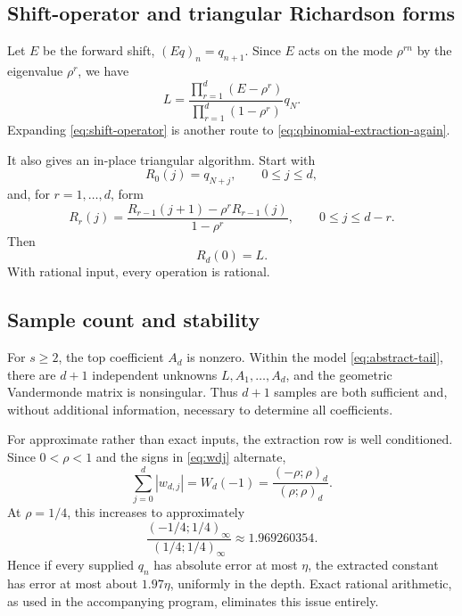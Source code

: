 \documentclass[11pt]{article}
\newcommand{\poch}[3]{\left(#1;#2\right)_{#3}}
\begin{document}
\subsection{Shift-operator and triangular Richardson forms}

Let $E$ be the forward shift, $(Eq)_n=q_{n+1}$.  Since $E$ acts on the mode
$\rho^{rn}$ by the eigenvalue $\rho^r$, we have
\begin{equation}
 \boxed{
 L=\frac{\prod_{r=1}^{d}(E-\rho^r)}
 {\prod_{r=1}^{d}(1-\rho^r)}q_N.}
 \label{eq:shift-operator}
\end{equation}
Expanding \eqref{eq:shift-operator} is another route to
\eqref{eq:qbinomial-extraction-again}.

It also gives an in-place triangular algorithm.  Start with
\begin{equation}
 R_0(j)=q_{N+j},\qquad 0\le j\le d,
\end{equation}
and, for $r=1,\ldots,d$, form
\begin{equation}
 R_r(j)=\frac{R_{r-1}(j+1)-\rho^rR_{r-1}(j)}{1-\rho^r},
 \qquad 0\le j\le d-r.
 \label{eq:richardson-recursion}
\end{equation}
Then
\begin{equation}
 R_d(0)=L.
 \label{eq:richardson-result}
\end{equation}
With rational input, every operation is rational.

\subsection{Sample count and stability}

For $s\ge2$, the top coefficient $A_d$ is nonzero.  Within the model
\eqref{eq:abstract-tail}, there are $d+1$ independent unknowns
$L,A_1,\ldots,A_d$, and the geometric Vandermonde matrix is nonsingular.
Thus $d+1$ samples are both sufficient and, without additional information,
necessary to determine all coefficients.

For approximate rather than exact inputs, the extraction row is well
conditioned.  Since $0<\rho<1$ and the signs in \eqref{eq:wdj} alternate,
\begin{equation}
 \sum_{j=0}^{d}|w_{d,j}|
 =W_d(-1)
 =\frac{\poch{-\rho}{\rho}{d}}{\poch{\rho}{\rho}{d}}.
 \label{eq:row-variation}
\end{equation}
At $\rho=1/4$, this increases to approximately
\begin{equation}
 \frac{\poch{-1/4}{1/4}{\infty}}
 {\poch{1/4}{1/4}{\infty}}
 \approx1.969260354.
 \label{eq:variation-numeric}
\end{equation}
Hence if every supplied $q_n$ has absolute error at most $\eta$, the extracted
constant has error at most about $1.97\eta$, uniformly in the depth.  Exact
rational arithmetic, as used in the accompanying program, eliminates this
issue entirely.
\end{document}
